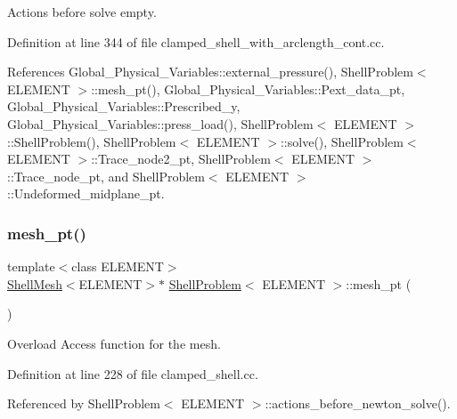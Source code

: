 Actions before solve empty. 



Definition at line 344 of file clamped\+\_\+shell\+\_\+with\+\_\+arclength\+\_\+cont.\+cc.



References Global\+\_\+\+Physical\+\_\+\+Variables\+::external\+\_\+pressure(), Shell\+Problem$<$ E\+L\+E\+M\+E\+N\+T $>$\+::mesh\+\_\+pt(), Global\+\_\+\+Physical\+\_\+\+Variables\+::\+Pext\+\_\+data\+\_\+pt, Global\+\_\+\+Physical\+\_\+\+Variables\+::\+Prescribed\+\_\+y, Global\+\_\+\+Physical\+\_\+\+Variables\+::press\+\_\+load(), Shell\+Problem$<$ E\+L\+E\+M\+E\+N\+T $>$\+::\+Shell\+Problem(), Shell\+Problem$<$ E\+L\+E\+M\+E\+N\+T $>$\+::solve(), Shell\+Problem$<$ E\+L\+E\+M\+E\+N\+T $>$\+::\+Trace\+\_\+node2\+\_\+pt, Shell\+Problem$<$ E\+L\+E\+M\+E\+N\+T $>$\+::\+Trace\+\_\+node\+\_\+pt, and Shell\+Problem$<$ E\+L\+E\+M\+E\+N\+T $>$\+::\+Undeformed\+\_\+midplane\+\_\+pt.

\mbox{\label{classShellProblem_a1905a1b913469ed54f7c8f55d133ff57}} 
\subsubsection{\texorpdfstring{mesh\+\_\+pt()}{mesh\_pt()}\hspace{0.1cm}{\footnotesize\ttfamily [1/2]}}
{\footnotesize\ttfamily template$<$class E\+L\+E\+M\+E\+NT$>$ \\
\hyperlink{classShellMesh}{Shell\+Mesh}$<$E\+L\+E\+M\+E\+NT$>$$\ast$ \hyperlink{classShellProblem}{Shell\+Problem}$<$ E\+L\+E\+M\+E\+NT $>$\+::mesh\+\_\+pt (\begin{DoxyParamCaption}{ }\end{DoxyParamCaption})\hspace{0.3cm}{\ttfamily [inline]}}



Overload Access function for the mesh. 



Definition at line 228 of file clamped\+\_\+shell.\+cc.



Referenced by Shell\+Problem$<$ E\+L\+E\+M\+E\+N\+T $>$\+::actions\+\_\+before\+\_\+newton\+\_\+solve().

\mbox{\label{classShellProblem_a1905a1b913469ed54f7c8f55d133ff57}} 
